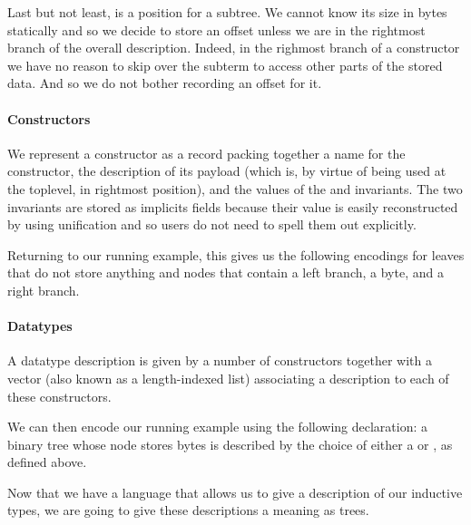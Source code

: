 Last but not least,  is a position for a subtree.
We cannot know its size in bytes statically and so we decide to store
an offset unless we are in the rightmost branch of the overall description.
%
Indeed, in the righmost branch of a constructor we have no reason to
skip over the subterm to access other parts of the stored data. And so we
do not bother recording an offset for it.


\paragraph{Constructors}
We represent a constructor as a record packing together
a name for the constructor,
the description of its payload (which is, by virtue of
being used at the toplevel, in rightmost position),
and the values of the  and
 invariants.
%
The two invariants are stored as implicits fields
because their value is easily reconstructed by \idris{}
using unification and so users do not need
to spell them out explicitly.


Returning to our running example, this gives us the following encodings for
leaves that do not store anything
and nodes that contain a left branch, a byte, and a right branch.



\paragraph{Datatypes}
A datatype description is given by a number of constructors together with
a vector (also known as a length-indexed list) associating a description
to each of these constructors.


We can then encode our running example using the following 
declaration: a binary tree whose node stores bytes is described by the choice
of either a  or , as defined above.


Now that we have a language that allows us to give a description of our
inductive types, we are going to give these descriptions a meaning as trees.
